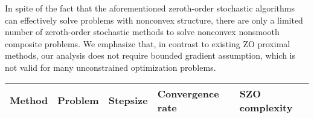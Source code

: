 In spite of the fact that the aforementioned zeroth-order stochastic algorithms can effectively solve problems with nonconvex structure, there are only a limited number of zeroth-order stochastic methods to solve nonconvex nonsmooth composite problems. We emphasize that, in contrast to existing ZO proximal methods, our analysis does not require bounded gradient assumption, which is not valid for many unconstrained optimization problems. 
\iffalse
It should be highlighted that computing full-gradient may not be effective for large-scale machine learning problems. Thus, we focus on studying a more general framework for ZO-ProxSVRG with different gradient estimators.
\fi
\begin{table*}[t]
\begin{center}
\begin{adjustbox}{width=\textwidth}
\begin{tabular}{ |l|l|l|l|l| } 
 \hline
 Method & Problem & Stepsize& Convergence rate & SZO complexity\\ 
 \hline
  

\end{tabular}
\end{adjustbox}
\end{center}
\end{table*}

